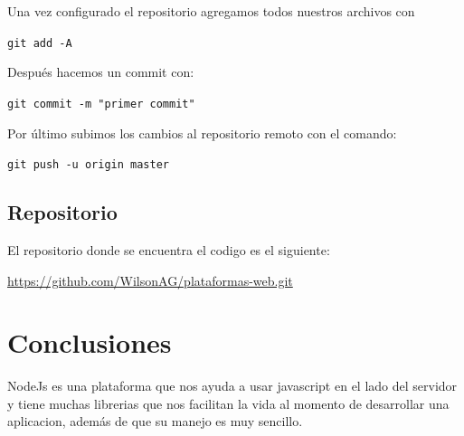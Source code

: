 \documentclass[12pt]{article}
\begin{document}
Una vez configurado el repositorio agregamos todos nuestros archivos con

\lstinline{git add -A}

Después hacemos un commit con:

\lstinline{git commit -m "primer commit"}

Por último subimos los cambios al repositorio remoto con el comando:

\lstinline{git push -u origin master}

\subsection{Repositorio}

El repositorio donde se encuentra el codigo es el siguiente:

\url{https://github.com/WilsonAG/plataformas-web.git}

\section{Conclusiones}

NodeJs es una plataforma que nos ayuda a usar javascript en el lado del servidor y tiene muchas librerias que nos facilitan la vida al momento de desarrollar una aplicacion, además de que su manejo es muy sencillo.
\end{document}
